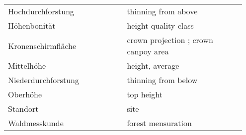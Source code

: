\begin{singlespace}
{\begin{longtabu}{p{0.475\linewidth} p{0.475\linewidth}}
      Hochdurchforstung & thinning from above \\
      Höhenbonität & height quality class \parencite[p.~159]{Assmann1970} \\
      Kronenschirmfläche & crown projection \parencite[p.~157]{Assmann1970}; crown canpoy area \parencite[p.~158]{Assmann1970} \\
      Mittelhöhe & height, average \\
      Niederdurchforstung & thinning from below \\
      Oberhöhe & top height \\
      Standort & site \\
      Waldmesskunde & forest mensuration \\
    \end{longtabu}
  }
\end{singlespace}

